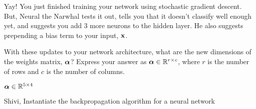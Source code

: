 \begin{parts}
\begin{subparts}
        
\subpart[2] Yay! You just finished training your network using stochastic gradient descent. But, Neural the Narwhal tests it out, tells you that it doesn't classify well enough yet, and suggests you add 3 more neurons to the hidden layer. He also suggests prepending a bias term to your input, $\mathbf{x}$.
    
    With these updates to your network architecture, what are the new dimensions of the weights matrix, $\boldsymbol \alpha$? Express your answer as $\boldsymbol \alpha \in \mathbb{R}^{r \times c}$, where $r$ is the number of rows and $c$ is the number of columns.
    
    \begin{tcolorbox}[fit,height=1cm, width=6cm, blank, borderline={1pt}{-2pt},nobeforeafter]
     \begin{soln}
    $\boldsymbol \alpha \in \mathbb{R}^{5 \times 4}$
    \end{soln}
    \end{tcolorbox}

    \begin{qauthor}
        Shivi, Instantiate the backpropagation algorithm for a neural network
    \end{qauthor}

    




\end{subparts}
\end{parts}
